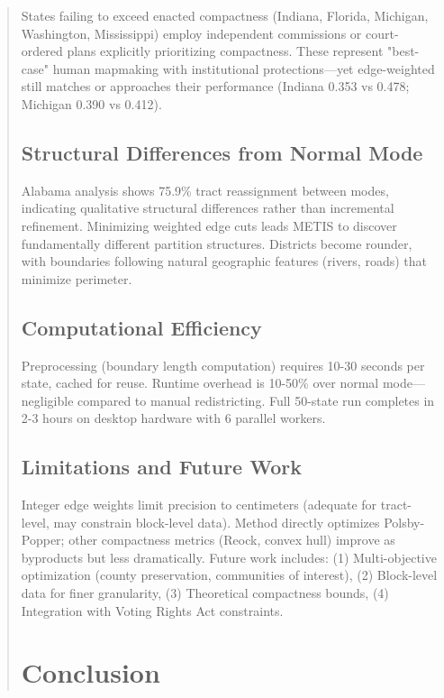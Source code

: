 \documentclass[11pt,twocolumn]{article}
\begin{document}
\begin{abstract}
States failing to exceed enacted compactness (Indiana, Florida, Michigan, Washington, Mississippi) employ independent commissions or court-ordered plans explicitly prioritizing compactness. These represent "best-case" human mapmaking with institutional protections—yet edge-weighted still matches or approaches their performance (Indiana 0.353 vs 0.478; Michigan 0.390 vs 0.412).

\subsection{Structural Differences from Normal Mode}

Alabama analysis shows 75.9\% tract reassignment between modes, indicating qualitative structural differences rather than incremental refinement. Minimizing weighted edge cuts leads METIS to discover fundamentally different partition structures. Districts become rounder, with boundaries following natural geographic features (rivers, roads) that minimize perimeter.

\subsection{Computational Efficiency}

Preprocessing (boundary length computation) requires 10-30 seconds per state, cached for reuse. Runtime overhead is 10-50\% over normal mode—negligible compared to manual redistricting. Full 50-state run completes in 2-3 hours on desktop hardware with 6 parallel workers.

\subsection{Limitations and Future Work}

Integer edge weights limit precision to centimeters (adequate for tract-level, may constrain block-level data). Method directly optimizes Polsby-Popper; other compactness metrics (Reock, convex hull) improve as byproducts but less dramatically. Future work includes: (1) Multi-objective optimization (county preservation, communities of interest), (2) Block-level data for finer granularity, (3) Theoretical compactness bounds, (4) Integration with Voting Rights Act constraints.

\section{Conclusion}


\end{abstract}
\end{document}
